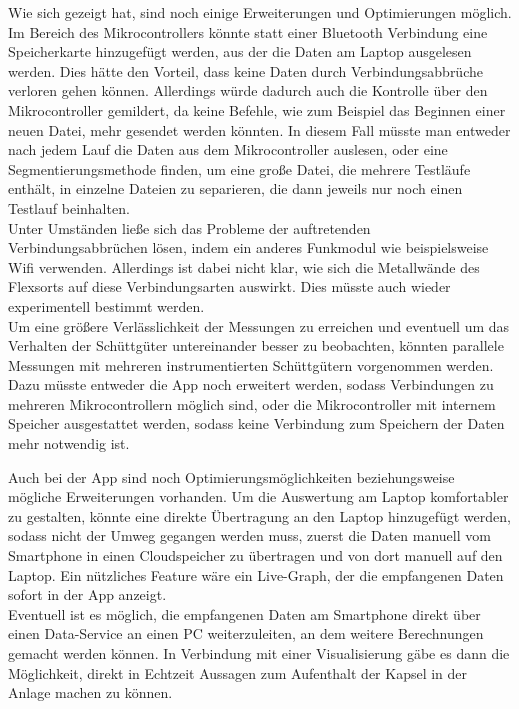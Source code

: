 Wie sich gezeigt hat, sind noch einige Erweiterungen und Optimierungen möglich. 
Im Bereich des Mikrocontrollers könnte statt einer Bluetooth Verbindung eine Speicherkarte hinzugefügt werden, aus der die Daten am Laptop ausgelesen werden. Dies hätte den Vorteil, dass keine Daten durch Verbindungsabbrüche verloren gehen können. Allerdings würde dadurch auch die Kontrolle über den Mikrocontroller gemildert, da keine Befehle, wie zum Beispiel das Beginnen einer neuen Datei, mehr gesendet werden könnten. In diesem Fall müsste man entweder nach jedem Lauf die Daten aus dem Mikrocontroller auslesen, oder eine Segmentierungsmethode finden, um eine große Datei, die mehrere Testläufe enthält, in einzelne Dateien zu separieren, die dann jeweils nur noch einen Testlauf beinhalten. \\
Unter Umständen ließe sich das Probleme der auftretenden Verbindungsabbrüchen lösen, indem ein anderes Funkmodul wie beispielsweise Wifi verwenden. Allerdings ist dabei nicht klar, wie sich die Metallwände des Flexsorts auf diese Verbindungsarten auswirkt. Dies müsste auch wieder experimentell bestimmt werden. \\
Um eine größere Verlässlichkeit der Messungen zu erreichen und eventuell um das Verhalten der Schüttgüter untereinander besser zu beobachten, könnten parallele Messungen mit mehreren instrumentierten Schüttgütern vorgenommen werden. Dazu müsste entweder die App noch erweitert werden, sodass Verbindungen zu mehreren Mikrocontrollern möglich sind, oder die Mikrocontroller mit internem Speicher ausgestattet werden, sodass keine Verbindung zum Speichern der Daten mehr notwendig ist.

Auch bei der App sind noch Optimierungsmöglichkeiten beziehungsweise mögliche Erweiterungen vorhanden. Um die Auswertung am Laptop komfortabler zu gestalten, könnte eine direkte Übertragung an den Laptop hinzugefügt werden, sodass nicht der Umweg gegangen werden muss, zuerst die Daten manuell vom Smartphone in einen Cloudspeicher zu übertragen und von dort manuell auf den Laptop. 
Ein nützliches Feature wäre ein Live-Graph, der die empfangenen Daten sofort in der App anzeigt.\\
Eventuell ist es möglich, die empfangenen Daten am Smartphone direkt über einen Data-Service an einen PC weiterzuleiten, an dem weitere Berechnungen gemacht werden können. In Verbindung mit einer Visualisierung gäbe es dann die Möglichkeit, direkt in Echtzeit Aussagen zum Aufenthalt der Kapsel in der Anlage machen zu können. 

